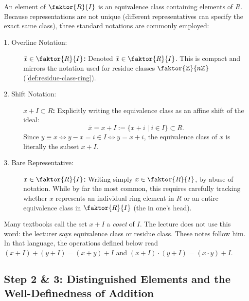 \begin{content}
An element of $\faktor{R}{I}$ is an equivalence class containing elements of $R$. Because representations are not unique (different representatives can specify the exact same class), three standard notations are commonly employed:

\begin{description}
    \item[1. Overline Notation:] \textbf{$\bar{x} \in \faktor{R}{I}$:} Denoted $\bar{x} \in \faktor{R}{I}$. This is compact and mirrors the notation used for residue classes $\faktor{\mathbb{Z}}{n\mathbb{Z}}$ (\cref{def:residue-class-ring}).
    \item[2. Shift Notation:] \textbf{$x + I \subset R$:} Explicitly writing the equivalence class as an affine shift of the ideal:
    \begin{equation}\label{eq:coset-explicit-def}
    \bar{x} = x + I := \{ x + i \mid i \in I \} \subset R.
    \end{equation}
    Since $y \equiv x \iff y - x = i \in I \iff y = x + i$, the equivalence class of $x$ is literally the subset $x + I$.
    \item[3. Bare Representative:] \textbf{$x \in \faktor{R}{I}$:} Writing simply $x \in \faktor{R}{I}$, by abuse of notation. While by far the most common, this requires carefully tracking whether $x$ represents an individual ring element in $R$ or an entire equivalence class in $\faktor{R}{I}$ (the  in one's head).
\end{description}
\end{content}

\begin{aiNote}
Many textbooks call the set $x + I$ a \emph{coset} of $I$. The lecture does not use this word: the lecturer says equivalence class or residue class. These notes follow him. In that language, the operations defined below read $(x + I) + (y + I) = (x + y) + I$ and $(x + I) \cdot (y + I) = (x \cdot y) + I$.
\end{aiNote}

\subsection{Step 2 \& 3: Distinguished Elements and the Well-Definedness of Addition}

